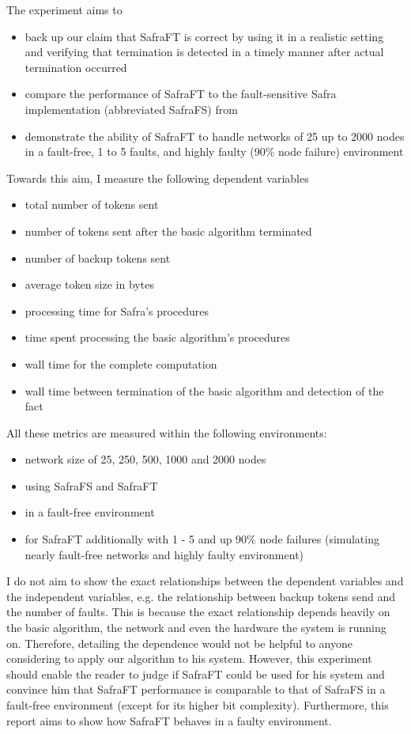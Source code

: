 The experiment aims to
\begin{itemize}
	\item back up our claim that SafraFT is correct by using it in a realistic setting and verifying that termination is detected in a timely manner after actual termination occurred
	\item compare the performance of SafraFT to the fault-sensitive Safra implementation (abbreviated SafraFS) from \cite{demirbas2000optimal}
	\item demonstrate the ability of SafraFT to handle networks of 25 up to 2000 nodes in a fault-free, 1 to 5 faults, and highly faulty (90\% node failure) environment
\end{itemize}

Towards this aim, I measure the following dependent variables
\begin{itemize}
	\item total number of tokens sent
	\item number of tokens sent after the basic algorithm terminated
	\item number of backup tokens sent
	\item average token size in bytes
	\item processing time for Safra's procedures
	\item time spent processing the basic algorithm's procedures
	\item wall time for the complete computation
	\item wall time  between termination of the basic algorithm and detection of the fact
\end{itemize}

All these metrics are measured within the following environments:
\begin{itemize}
	\item network size of 25, 250, 500, 1000 and 2000 nodes
	\item using SafraFS and SafraFT
	\item in a fault-free environment
	\item for SafraFT additionally with 1 - 5 and up 90\% node failures (simulating nearly fault-free networks and highly faulty environment)
\end{itemize}

I do not aim to show the exact relationships between the dependent variables and the independent variables, e.g. the relationship between backup tokens send and the number of faults.
This is because the exact relationship depends heavily on the basic algorithm, the network and even the hardware the system is running on.
Therefore, detailing the dependence would not be helpful to anyone considering to apply our algorithm to his system.
However, this experiment should enable the reader to judge if SafraFT could be used for his system and convince him that SafraFT performance is comparable to that of SafraFS in a fault-free environment (except for its higher bit complexity).
Furthermore, this report aims to show how SafraFT behaves in a faulty environment.

